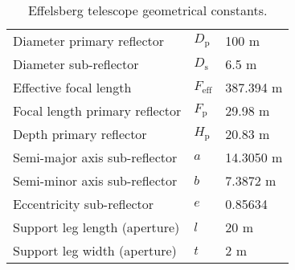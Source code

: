 \documentclass[
    ]
    {aa}
\begin{document}
\begin{appendix}
        \begin{table}[h]
            \centering
            \caption{Effelsberg telescope geometrical constants.}
            \label{tab:effelberg_geometry}
            \begin{tabular}{lll}
                \hline
                Diameter primary reflector & $D_\text{p}$ & 100 m \\
                Diameter sub-reflector & $D_\text{s}$ & 6.5 m \\
                Effective focal length & $F_\text{eff}$ & 387.394 m \\
                Focal length primary reflector & $ F_\text{p}$ & 29.98 m \\
                Depth primary reflector & $H_\text{p}$& 20.83 m\\
                Semi-major axis sub-reflector &$a$& 14.3050 m \\
                Semi-minor axis sub-reflector & $b$ & 7.3872 m\\
                Eccentricity sub-reflector &$e$ & 0.85634 \\
                Support leg length (aperture) &$l$ & 20 m \\
                Support leg width (aperture) &$t$ & 2 m \\
                \hline
            \end{tabular}
        \end{table}


\end{appendix}
\end{document}
